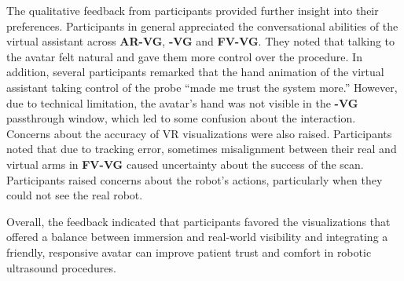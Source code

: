 The qualitative feedback from participants provided further insight into their preferences. Participants in general appreciated the conversational abilities of the virtual assistant across \textbf{AR-VG}, \textbf{-VG} and \textbf{FV-VG}. They noted that talking to the avatar felt natural and gave them more control over the procedure. In addition, several participants remarked that the hand animation of the virtual assistant taking control of the probe “made me trust the system more.” However, due to technical limitation, the avatar’s hand was not visible in the \textbf{-VG} passthrough window, which led to some confusion about the interaction.
Concerns about the accuracy of VR visualizations were also raised. Participants noted that due to tracking error, sometimes misalignment between their real and virtual arms in \textbf{FV-VG} caused uncertainty about the success of the scan. Participants raised concerns about the robot’s actions, particularly when they could not see the real robot.

Overall, the feedback indicated that participants favored the visualizations that offered a balance between immersion and real-world visibility and integrating a friendly, responsive avatar can improve patient trust and comfort in robotic ultrasound procedures.
